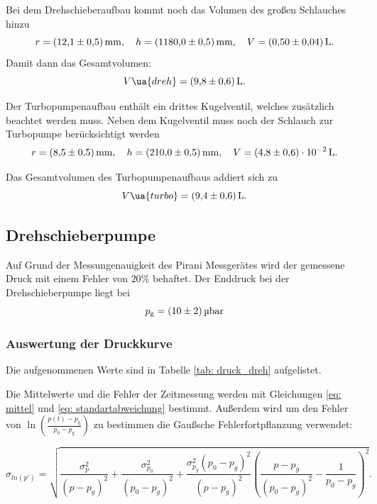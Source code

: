 Bei dem Drehschieberaufbau kommt noch das Volumen des großen Schlauches  hinzu %
\begin{equation*}
  r=\SI{12.1\pm 0.5}{\milli\meter}, \quad h=\SI{1180\pm0.5}{\milli\meter}, \quad V=\SI{ 0.5\pm0.04}{\litre}.
\end{equation*}
Damit dann das Gesamtvolumen:
\begin{equation}
  \label{eq:volumen_drehschieber}
  V\ua{dreh}=\SI{9.8\pm0.6}{\litre}.
\end{equation}

Der Turbopumpenaufbau enthält ein drittes Kugelventil, welches zusätzlich beachtet werden muss.
Neben dem Kugelventil muss noch der Schlauch zur Turbopumpe  berücksichtigt werden
\begin{equation*}
  r=\SI{8.5\pm 0.5}{\milli\meter}, \quad h=\SI{210\pm0.5}{\milli\meter}, \quad V=\SI{ 4.8\pm0.6 e-2}{\litre}.
\end{equation*}

Das Gesamtvolumen des Turbopumpenaufbaus addiert sich zu
\begin{equation}
  \label{eq:volume_turbo}
  V\ua{turbo}=\SI{9.4\pm0.6}{\litre}.
\end{equation}
\subsection{Drehschieberpumpe}
Auf Grund der Messungenauigkeit des Pirani Messgerätes wird der gemessene
Druck mit einem Fehler von $20\%$ behaftet.
Der Enddruck bei der Drehschieberpumpe liegt bei
\begin{equation}
  \label{eq:enddruck_drehschieber}
  p_{\mathrm{g}}=\SI{10 \pm 2 }{\micro\bar}
\end{equation}

\subsubsection{Auswertung der Druckkurve}

Die aufgenommenen Werte sind in Tabelle \ref{tab: druck_dreh} aufgelistet.

Die Mittelwerte und die Fehler der Zeitmessung werden mit Gleichungen \eqref{eq: mittel} und %
\eqref{eq: standartabweichung} bestimmt. Außerdem wird um den Fehler von $\ln(\frac{ p(t)-p_{ \mathrm{g} } }{ p_0-p_{ \mathrm{g} } })$
zu bestimmen die Gaußsche Fehlerfortpflanzung verwendet: %

\begin{equation}
  \label{eq: fehler_ln_druck}
  \sigma_{ln(p')}=\sqrt{\frac{\sigma_{p}^{2}}{\left(p - p_{g}\right)^{2}} + \frac{\sigma_{p_{0}}^{2}}{\left(p_{0} - p_{g}\right)^{2}} + \frac{\sigma_{p_{g}}^{2} \left(p_{0} - p_{g}\right)^{2}}{\left(p - p_{g}\right)^{2}} \left(\frac{p - p_{g}}{\left(p_{0} - p_{g}\right)^{2}} - \frac{1}{p_{0} - p_{g}}\right)^{2}}.
\end{equation}

